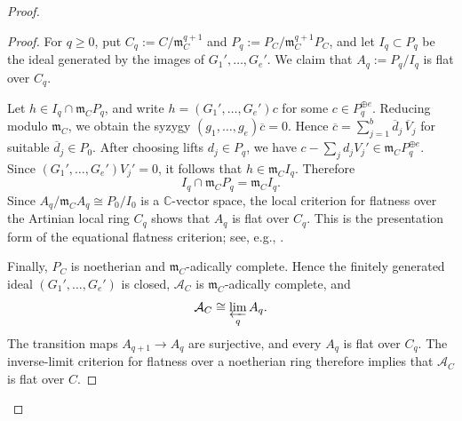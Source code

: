 \documentclass[11pt]{amsart}
\numberwithin{equation}{section}
\theoremstyle{plain}
\theoremstyle{definition}
\newcommand{\0}{$0$-mutable}
\newcommand{\CC}{\ensuremath{\mathbb{C}}}
\renewcommand{\1}{$1$-rigid}
\renewcommand{\0}{$0$-mutable}
\begin{document}
\begin{proof}
\begin{proof}
For \(q\geq0\), put \(C_q:=C/\mathfrak m_C^{q+1}\) and
\(P_q:=P_C/\mathfrak m_C^{q+1}P_C\), and let \(I_q\subset P_q\) be
the ideal generated by the images of \(G_1',\ldots,G_e'\). We claim
that \(A_q:=P_q/I_q\) is flat over \(C_q\).

Let \(h\in I_q\cap\mathfrak m_CP_q\), and write
\(h=(G_1',\ldots,G_e')c\) for some \(c\in P_q^{\oplus e}\). Reducing
modulo \(\mathfrak m_C\), we obtain the syzygy
\((g_1,\ldots,g_e)\overline c=0\). Hence
\(\overline c=\sum_{j=1}^b\overline d_j\,\overline V_j\) for suitable
\(\overline d_j\in P_0\). After choosing lifts \(d_j\in P_q\), we have
\(c-\sum_jd_jV_j'\in\mathfrak m_CP_q^{\oplus e}\). Since
\((G_1',\ldots,G_e')V_j'=0\), it follows that
\(h\in\mathfrak m_CI_q\). Therefore
\[
I_q\cap\mathfrak m_CP_q=\mathfrak m_CI_q.
\]
Since \(A_q/\mathfrak m_CA_q\cong P_0/I_0\) is a \(\CC\)-vector space,
the local criterion for flatness over the Artinian local ring \(C_q\)
shows that \(A_q\) is flat over \(C_q\). This is the presentation form
of the equational flatness criterion; see, e.g.,
\cite[Lemma~3.5]{Fil26}.

Finally, \(P_C\) is noetherian and \(\mathfrak m_C\)-adically
complete. Hence the finitely generated ideal
\((G_1',\ldots,G_e')\) is closed, \(\mathcal A_C\) is
\(\mathfrak m_C\)-adically complete, and
\[
\mathcal A_C\cong\varprojlim_q A_q.
\]
The transition maps \(A_{q+1}\to A_q\) are surjective, and every
\(A_q\) is flat over \(C_q\). The inverse-limit criterion for
flatness over a noetherian ring therefore implies that \(\mathcal A_C\) is
flat over \(C\).
\end{proof}





\end{proof}
\end{document}
